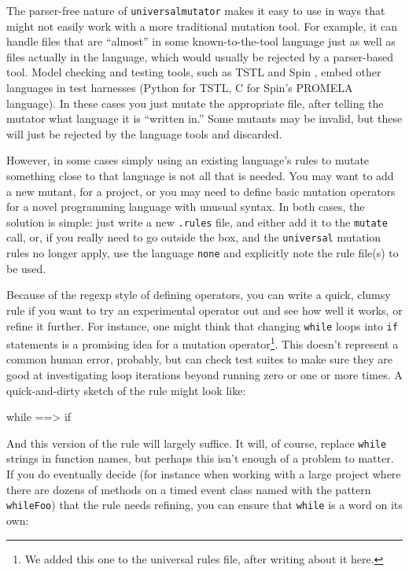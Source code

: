 The parser-free nature of {\tt universalmutator} makes it easy to
use in ways that might not easily
work with a more traditional mutation tool.  For example, it can
handle files that are ``almost'' in some known-to-the-tool language
just as well as files actually in the language, which would usually be
rejected by a parser-based tool.  Model checking and
testing tools, such as TSTL  and Spin \cite{SPIN}, embed other
languages in test harnesses (Python for TSTL, C for Spin's PROMELA
language).  In these cases you just mutate the appropriate file, after
telling the mutator what language it is ``written in.''  Some mutants
may be invalid, but these will just be rejected by the language tools
and discarded.

However, in some cases simply using an existing language's rules to
mutate something close to that language is not
all that is needed.  You may want to add a new mutant, for a project,
or you may need to define basic mutation operators for a novel
programming language with unusual syntax.  In both cases, the solution
is simple:  just write a new {\tt .rules} file, and either add it to
the {\tt mutate} call, or, if you really need to go outside the box,
and the {\tt universal} mutation rules no longer apply, use the
language {\tt none} and explicitly note the rule file(s) to be used.

Because of the regexp style of defining operators, you can write a
quick, clumsy rule if you want to try an experimental operator out and
see how well it works, or refine it further.  For instance, one might
think that changing {\tt while} loops into {\tt if} statements is a
promising idea for a mutation operator\footnote{We added this one to
  the universal rules file, after writing about it here.}.  This doesn't represent a common human error,
probably, but can check test suites to make sure they are good at
investigating loop iterations beyond running zero or one or more
times.  A quick-and-dirty sketch of the rule might look like:

\begin{code}
while ==> if 
\end{code}

And this version of the rule will largely suffice.  It will, of
course, replace {\tt while} strings in function names, but perhaps
this isn't enough of a problem to matter.  If you do eventually decide (for instance when
working with a large project where there are dozens of methods on a
timed event class named with the pattern {\tt whileFoo}) that the rule
needs refining, you can ensure that {\tt while} is a word on its own:

